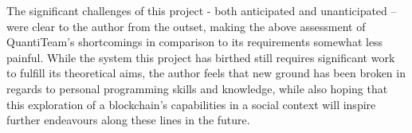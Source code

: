 The significant challenges of this project - both anticipated and
unanticipated -- were clear to the author from the outset, making the
above assessment of QuantiTeam's shortcomings in comparison to its
requirements somewhat less painful. While the system this project has
birthed still requires significant work to fulfill its theoretical aims,
the author feels that new ground has been broken in regards to personal
programming skills and knowledge, while also hoping that this
exploration of a blockchain's capabilities in a social context will
inspire further endeavours along these lines in the future.

\printbibliography




